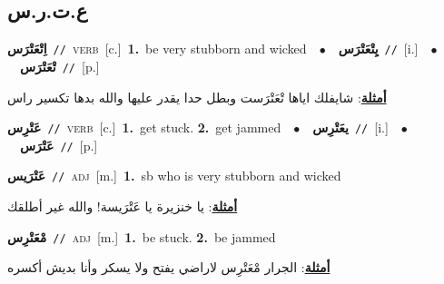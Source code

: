 \documentclass[10pt,a4paper,twoside]{article} %
\begin{document}
\begin{multicols}{2}
{{{{{{{{{\vspace{-3mm}
\subsection*{\color{blue}\foreignlanguage{arabic}{ع.ت.ر.س}\color{blue}{}} 

{\setlength\topsep{0pt}\textbf{\foreignlanguage{arabic}{اِتْعَتْرَس}}\ {\color{gray}\texttt{//}\color{black}}\ \textsc{verb}\ [c.]\ \textbf{1.}~be very stubborn and wicked\ \ $\bullet$\ \ \setlength\topsep{0pt}\textbf{\foreignlanguage{arabic}{يِتْعَتْرَس}}\ {\color{gray}\texttt{//}\color{black}}\ [i.]\ \ $\bullet$\ \ \setlength\topsep{0pt}\textbf{\foreignlanguage{arabic}{تْعَتْرَس}}\ {\color{gray}\texttt{//}\color{black}}\ [p.]\  \begin{flushright}\color{gray}\foreignlanguage{arabic}{\textbf{\underline{\foreignlanguage{arabic}{أمثلة}}}: شايفلك اياها تْعَتْرَست وبطل حدا يقدر عليها والله بدها تكسير راس}\end{flushright}\color{black}} \vspace{2mm}

{\setlength\topsep{0pt}\textbf{\foreignlanguage{arabic}{عَتْرِس}}\ {\color{gray}\texttt{//}\color{black}}\ \textsc{verb}\ [c.]\ \textbf{1.}~get stuck.  \textbf{2.}~get jammed\ \ $\bullet$\ \ \setlength\topsep{0pt}\textbf{\foreignlanguage{arabic}{يعَتْرِس}}\ {\color{gray}\texttt{//}\color{black}}\ [i.]\ \ $\bullet$\ \ \setlength\topsep{0pt}\textbf{\foreignlanguage{arabic}{عَتْرَس}}\ {\color{gray}\texttt{//}\color{black}}\ [p.]\ 

{\setlength\topsep{0pt}\textbf{\foreignlanguage{arabic}{عَتْرَيس}}\ {\color{gray}\texttt{//}\color{black}}\ \textsc{adj}\ [m.]\ \textbf{1.}~sb who is very stubborn and wicked\  \begin{flushright}\color{gray}\foreignlanguage{arabic}{\textbf{\underline{\foreignlanguage{arabic}{أمثلة}}}: يا خنزيرة يا عَتْرَيسة! والله غير أطلقك}\end{flushright}\color{black}} \vspace{2mm}

{\setlength\topsep{0pt}\textbf{\foreignlanguage{arabic}{مْعَتْرِس}}\ {\color{gray}\texttt{//}\color{black}}\ \textsc{adj}\ [m.]\ \textbf{1.}~be stuck.  \textbf{2.}~be jammed\  \begin{flushright}\color{gray}\foreignlanguage{arabic}{\textbf{\underline{\foreignlanguage{arabic}{أمثلة}}}: الجرار مْعَتْرِس لاراضي يفتح ولا يسكر وأنا بديش أكسره}\end{flushright}\color{black}} \vspace{2mm}

}}}}}}}}}}
\end{multicols}
\end{document}
